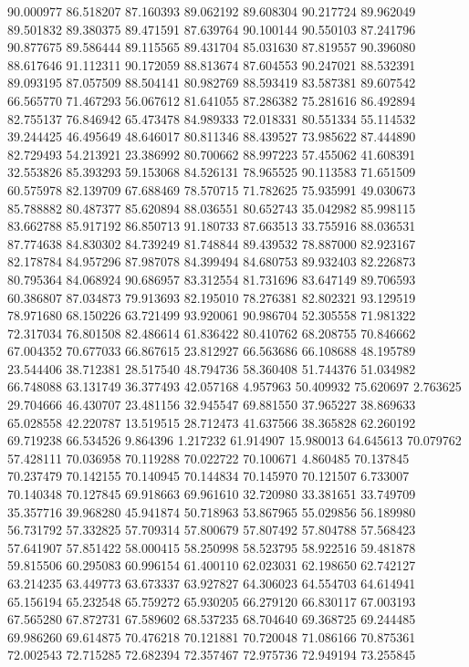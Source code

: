 90.000977
86.518207
87.160393
89.062192
89.608304
90.217724
89.962049
89.501832
89.380375
89.471591
87.639764
90.100144
90.550103
87.241796
90.877675
89.586444
89.115565
89.431704
85.031630
87.819557
90.396080
88.617646
91.112311
90.172059
88.813674
87.604553
90.247021
88.532391
89.093195
87.057509
88.504141
80.982769
88.593419
83.587381
89.607542
66.565770
71.467293
56.067612
81.641055
87.286382
75.281616
86.492894
82.755137
76.846942
65.473478
84.989333
72.018331
80.551334
55.114532
39.244425
46.495649
48.646017
80.811346
88.439527
73.985622
87.444890
82.729493
54.213921
23.386992
80.700662
88.997223
57.455062
41.608391
32.553826
85.393293
59.153068
84.526131
78.965525
90.113583
71.651509
60.575978
82.139709
67.688469
78.570715
71.782625
75.935991
49.030673
85.788882
80.487377
85.620894
88.036551
80.652743
35.042982
85.998115
83.662788
85.917192
86.850713
91.180733
87.663513
33.755916
88.036531
87.774638
84.830302
84.739249
81.748844
89.439532
78.887000
82.923167
82.178784
84.957296
87.987078
84.399494
84.680753
89.932403
82.226873
80.795364
84.068924
90.686957
83.312554
81.731696
83.647149
89.706593
60.386807
87.034873
79.913693
82.195010
78.276381
82.802321
93.129519
78.971680
68.150226
63.721499
93.920061
90.986704
52.305558
71.981322
72.317034
76.801508
82.486614
61.836422
80.410762
68.208755
70.846662
67.004352
70.677033
66.867615
23.812927
66.563686
66.108688
48.195789
23.544406
38.712381
28.517540
48.794736
58.360408
51.744376
51.034982
66.748088
63.131749
36.377493
42.057168
4.957963
50.409932
75.620697
2.763625
29.704666
46.430707
23.481156
32.945547
69.881550
37.965227
38.869633
65.028558
42.220787
13.519515
28.712473
41.637566
38.365828
62.260192
69.719238
66.534526
9.864396
1.217232
61.914907
15.980013
64.645613
70.079762
57.428111
70.036958
70.119288
70.022722
70.100671
4.860485
70.137845
70.237479
70.142155
70.140945
70.144834
70.145970
70.121507
6.733007
70.140348
70.127845
69.918663
69.961610
32.720980
33.381651
33.749709
35.357716
39.968280
45.941874
50.718963
53.867965
55.029856
56.189980
56.731792
57.332825
57.709314
57.800679
57.807492
57.804788
57.568423
57.641907
57.851422
58.000415
58.250998
58.523795
58.922516
59.481878
59.815506
60.295083
60.996154
61.400110
62.023031
62.198650
62.742127
63.214235
63.449773
63.673337
63.927827
64.306023
64.554703
64.614941
65.156194
65.232548
65.759272
65.930205
66.279120
66.830117
67.003193
67.565280
67.872731
67.589602
68.537235
68.704640
69.368725
69.244485
69.986260
69.614875
70.476218
70.121881
70.720048
71.086166
70.875361
72.002543
72.715285
72.682394
72.357467
72.975736
72.949194
73.255845
